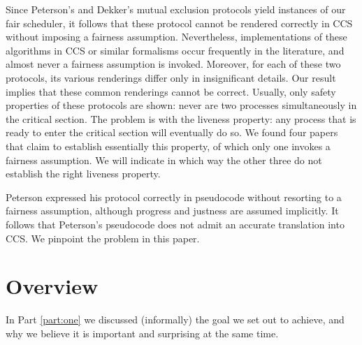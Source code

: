 \documentclass[smallcondensed]{svjour3}
\newcommand{\Part}[1]{Part {\ref{part:#1}}}
\newcounter {part}
\begin{document}
Since Peterson's and Dekker's mutual exclusion protocols yield instances of our fair scheduler,
it follows that these protocol cannot be rendered correctly in CCS
without imposing a fairness assumption. Nevertheless, implementations of these algorithms in CCS
or similar formalisms occur frequently in the literature, and almost never a fairness assumption is invoked.
Moreover, for each of these two protocols, its various renderings differ only in insignificant details.
Our result implies that these common renderings cannot be correct.
Usually, only safety properties of these protocols are shown: never are two processes simultaneously in
the critical section. The problem is with the liveness property: any process that is ready to enter
the critical section will eventually do so. We found four papers that claim to establish essentially this
property, of which only one invokes a fairness assumption.
We will indicate in which way the other three do not establish the right liveness property.

Peterson expressed his protocol correctly in pseudocode
without resorting to a fairness assumption, although progress and justness are assumed implicitly.
It follows that Peterson's pseudocode does not admit an accurate translation into CCS\@.
We pinpoint the problem in this paper.

\section{Overview}


In \Part{one} we discussed (informally) the goal we set out to achieve, and 
why we believe it is important and surprising at the same time.
\end{document}
